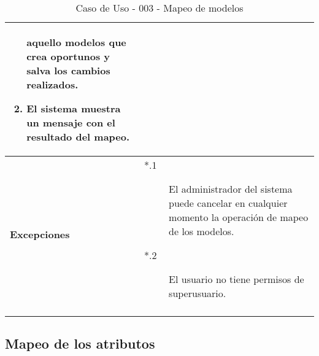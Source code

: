 \begin{center}
\begin{longtable}{||p{3.4cm}|p{12cm}||}
\begin{enumerate}
                       aquello modelos que crea oportunos y salva los cambios
                       realizados.
                \item El sistema muestra un mensaje con el resultado del mapeo.
             \end{enumerate}\\
 \hline \bf Excepciones &
             \begin{description}
                \item[*.1] El administrador del sistema puede cancelar en
                          cualquier momento la operación de mapeo de los modelos.
                \item[*.2] El usuario no tiene permisos de superusuario.
             \end{description}\\
\hline
\hline
\caption{\label{tab:caso003} Caso de Uso - 003 - Mapeo de modelos} 
\end{longtable}
\end{center}


\subsection{Mapeo de los atributos}

